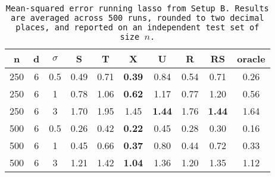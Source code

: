 \begin{table}[ht]
\centering
\begin{tabular}{cccccccccc}
  \hline
n & d & $\sigma$ & S & T & X & U & R & RS & oracle \\ 
  \hline
250 & 6 & 0.5 & 0.49 & 0.71 & \bf 0.39 & 0.84 & 0.54 & 0.71 & 0.26 \\ 
  250 & 6 & 1 & 0.78 & 1.06 & \bf 0.62 & 1.17 & 0.77 & 1.20 & 0.56 \\ 
  250 & 6 & 3 & 1.70 & 1.95 & 1.45 & \bf 1.44 & 1.76 & \bf 1.44 & 1.64 \\ 
  500 & 6 & 0.5 & 0.26 & 0.42 & \bf 0.22 & 0.45 & 0.28 & 0.30 & 0.16 \\ 
  500 & 6 & 1 & 0.45 & 0.66 & \bf 0.37 & 0.80 & 0.44 & 0.72 & 0.33 \\ 
  500 & 6 & 3 & 1.21 & 1.42 & \bf 1.04 & 1.36 & 1.20 & 1.35 & 1.12 \\ 
   \hline
\end{tabular}
\caption{\tt Mean-squared error running \texttt{lasso} from Setup B. Results are averaged across 500 runs, rounded to two decimal places, and reported on an independent test set of size $n$.} 
\label{table:setup2}
\end{table}
